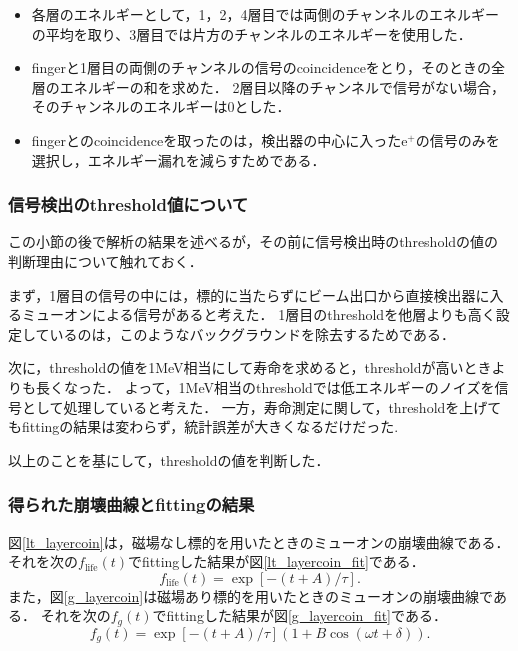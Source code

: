 \begin{enumerate}
\begin{itemize}
\item 各層のエネルギーとして，1，2，4層目では両側のチャンネルのエネルギーの平均を取り、3層目では片方のチャンネルのエネルギーを使用した．
\item fingerと1層目の両側のチャンネルの信号のcoincidenceをとり，そのときの全層のエネルギーの和を求めた．
2層目以降のチャンネルで信号がない場合，そのチャンネルのエネルギーは0とした．
\item fingerとのcoincidenceを取ったのは，検出器の中心に入ったe$^{+}$の信号のみを選択し，エネルギー漏れを減らすためである．%
\end{itemize}
\end{enumerate}

\subsubsection{信号検出のthreshold値について}
この小節の後で解析の結果を述べるが，その前に信号検出時のthresholdの値の判断理由について触れておく．

まず，1層目の信号の中には，標的に当たらずにビーム出口から直接検出器に入るミューオンによる信号があると考えた．
1層目のthresholdを他層よりも高く設定しているのは，このようなバックグラウンドを除去するためである．%

次に，thresholdの値を1MeV相当にして寿命を求めると，thresholdが高いときよりも長くなった．
よって，1MeV相当のthresholdでは低エネルギーのノイズを信号として処理していると考えた．
一方，寿命測定に関して，thresholdを上げてもfittingの結果は変わらず，統計誤差が大きくなるだけだった.%

以上のことを基にして，thresholdの値を判断した．

\subsubsection{得られた崩壊曲線とfittingの結果}
図\ref{lt_layercoin}は，磁場なし標的を用いたときのミューオンの崩壊曲線である．
それを次の$f_{\mathrm{life}}(t)$でfittingした結果が図\ref{lt_layercoin_fit}である．
\begin{equation*}
f_{\mathrm{life}}(t) = \exp[-(t+A)/\tau].
\end{equation*}
また，図\ref{g_layercoin}は磁場あり標的を用いたときのミューオンの崩壊曲線である．
それを次の$f_{g}(t)$でfittingした結果が図\ref{g_layercoin_fit}である．
\begin{equation*}
f_{g}(t) = \exp[-(t+A)/\tau](1+B\cos(\omega t + \delta)).
\end{equation*}

